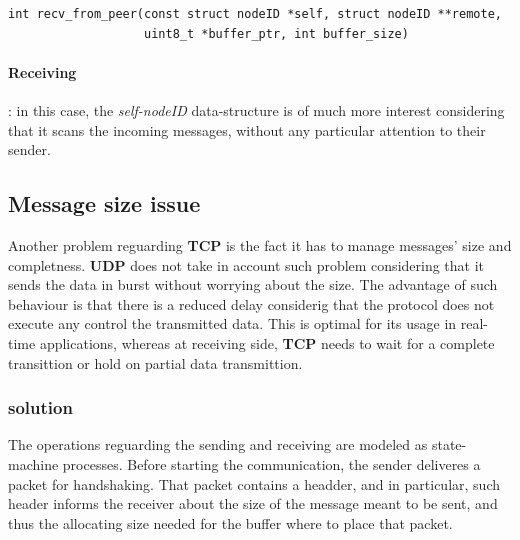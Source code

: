 \begin{lstlisting}
int recv_from_peer(const struct nodeID *self, struct nodeID **remote,
                   uint8_t *buffer_ptr, int buffer_size)
\end{lstlisting}
\paragraph{Receiving}: in this case, the \textit{self-nodeID} data-structure is of much more interest
considering that it scans the incoming messages, without any particular attention to their sender.


\subsection{Message size issue}
Another problem reguarding \textbf{TCP} is the fact it has to manage messages' size and completness.
\textbf{UDP} does not take in account such problem considering that it sends the data in burst without
worrying about the size. The advantage of such behaviour is that there is a reduced delay considerig that
the protocol does not execute any control the transmitted data. This is optimal for its usage in real-time
applications, whereas at receiving side, \textbf{TCP} needs to wait for a complete transittion or hold on
partial data transmittion.

\subsubsection{solution}
The operations reguarding the sending and receiving are modeled as state-machine processes. Before starting 
the communication, the sender deliveres a packet for handshaking. That packet contains a headder, and in
particular, such header informs the receiver about the size of the message meant to be sent, and thus the
allocating size needed for the buffer where to place that packet.


